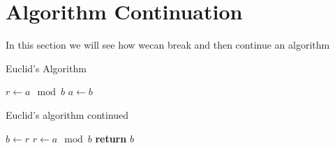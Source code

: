 \documentclass{article}
\begin{document}
\pagebreak

\section{Algorithm Continuation}
In this section we will see how wecan break and then continue an algorithm

\begin{algorithm}
\caption{Euclid's Algorithm} \label{algo:euclid}
\begin{algorithmic}[1]
	\State $r \gets a \mod b$
	 
		\State $a \gets b$
\end{algorithmic}
\end{algorithm}


\begin{algorithm}
\caption{Euclid's algorithm continued} \label{algo:euclid2}
\begin{algorithmic}[1]
		\State $b \gets r$
		\State $r \gets a \mod b$
	\EndWhile
	\State \textbf{return} $b$ 
\EndProcedure

\end{algorithmic}
\end{algorithm}
\end{document}

